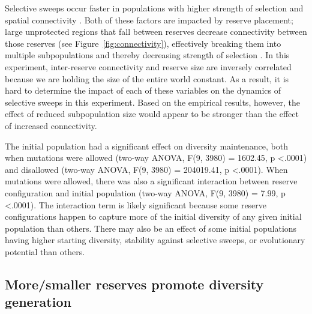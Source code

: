 \documentclass[letterpaper]{article}
\begin{document}
Selective sweeps occur faster in populations with higher strength of selection and spatial connectivity \citep{cantu-paz_migration_2001}. Both of these factors are impacted by reserve placement; large unprotected regions that fall between reserves decrease connectivity between those reserves (see Figure~\ref{fig:connectivity}), effectively breaking them into multiple subpopulations and thereby decreasing strength of selection \citep{gavrilets_dynamic_2005}. In this experiment, inter-reserve connectivity and reserve size are inversely correlated because we are holding the size of the entire world constant. As a result, it is hard to determine the impact of each of these variables on the dynamics of selective sweeps in this experiment. Based on the empirical results, however, the effect of reduced subpopulation size would appear to be stronger than the effect of increased connectivity.
        


The initial population had a significant effect on diversity maintenance, both when mutations were allowed (two-way ANOVA, F(9, 3980) = 1602.45, p \textless .0001) and disallowed  (two-way ANOVA, F(9, 3980) = 204019.41, p \textless .0001). When mutations were allowed, there was also a significant interaction between reserve configuration and initial population (two-way ANOVA, F(9, 3980) = 7.99, p \textless .0001). The interaction term is likely significant because some reserve configurations happen to capture more of the initial diversity of any given initial population than others. There may also be an effect of some initial populations having higher starting diversity, stability against selective sweeps, or evolutionary potential than others. 
        
\subsection{More/smaller reserves promote diversity generation}
        
\end{document}
